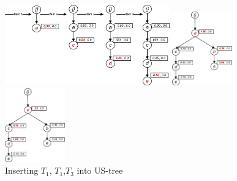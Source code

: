 %
%

\begin{figure}
\begin{minipage}{0.4\textwidth}
  \centering
	\includegraphics[width=\textwidth,height=3.5cm]{images/sim_01.jpg} 
\end{minipage}
\hfill
\begin{minipage}{0.18\textwidth}
  \centering
	\includegraphics[width=\textwidth,height=3.2cm]{images/sim_02.jpg} 
\end{minipage}
\hfill
\begin{minipage}{0.18\textwidth}
  \centering
	\includegraphics[width=\textwidth,height=3.2cm]{images/sim_03.jpg} 
\end{minipage}
\caption{Inserting $T_1$, $T_1$,$T_3$ into US-tree}
\label{figure:slide}
\end{figure}
